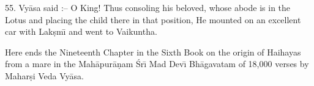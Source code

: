 55. Vy\=asa said :-- O King! Thus consoling his beloved, whose abode is in the Lotus and placing the child there in that position, He mounted on an excellent car with Lak\d{s}m\={\i} and went to Vaikuntha.

Here ends the Nineteenth Chapter in the Sixth Book on the origin of Haihayas from a mare in the Mah\=apur\=a\d{n}am \'Sr\={\i} Mad Dev\={\i} Bh\=agavatam of 18,000 verses by Mahar\d{s}i Veda Vy\=asa.



